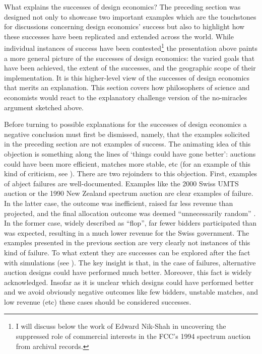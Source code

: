 What explains the successes of design economics? The preceding section was designed not only to showcase two important examples which are the touchstones for discussions concerning design economics' success but also to highlight how these successes have been replicated and extended across the world. While individual instances of success have been contested\footnote{I will discuss below the work of Edward Nik-Shah \autocite*{nikkhah2008} in uncovering the suppressed role of commercial interests in the FCC's 1994 spectrum auction from archival records.} the presentation above paints a more general picture of the successes of design economics: the varied goals that have been achieved, the extent of the successes, and the geographic scope of their implementation. It is this higher-level view of the successes of design economics that merits an explanation. This section covers how philosophers of science and economists would react to the explanatory challenge version of the no-miracles argument sketched above. 

Before turning to possible explanations for the successes of design economics a negative conclusion must first be dismissed, namely, that the examples solicited in the preceding section are not examples of success. The animating idea of this objection is something along the lines of `things could have gone better': auctions could have been more efficient, matches more stable, etc (for an example of this kind of criticism, see \cite{ledyard1997}). There are two rejoinders to this objection. First, examples of abject failures are well-documented. Examples like the 2000 Swiss UMTS auction \autocite{wolfstetter2001} or the 1990 New Zealand spectrum auction \autocite[\S1.2.2]{milgrom2004} are clear examples of failure. In the latter case, the outcome was inefficient, raised far less revenue than projected, and the final allocation outcome was deemed ``unnecessarily random'' \autocite[12]{milgrom2004}. In the former case, widely described as ``flop'', far fewer bidders participated than was expected, resulting in a much lower revenue for the Swiss government. The examples presented in the previous section are very clearly not instances of this kind of failure. To what extent they are successes can be explored after the fact with simulations (see \cite{newman2024}). The key insight is that, in the case of failures, alternative auction designs could have performed much better. Moreover, this fact is widely acknowledged. Insofar as it is unclear which designs could have performed better and we avoid obviously negative outcomes like few bidders, unstable matches, and low revenue (etc) these cases should be considered successes. 

